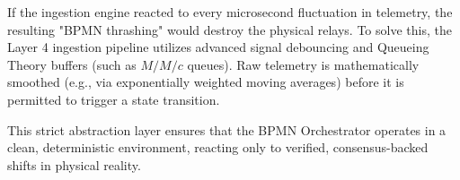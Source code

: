 If the ingestion engine reacted to every microsecond fluctuation in telemetry, the resulting "BPMN thrashing" would destroy the physical relays. To solve this, the Layer 4 ingestion pipeline utilizes advanced signal debouncing and Queueing Theory buffers (such as $M/M/c$ queues). Raw telemetry is mathematically smoothed (e.g., via exponentially weighted moving averages) before it is permitted to trigger a state transition. 

This strict abstraction layer ensures that the BPMN Orchestrator operates in a clean, deterministic environment, reacting only to verified, consensus-backed shifts in physical reality.
